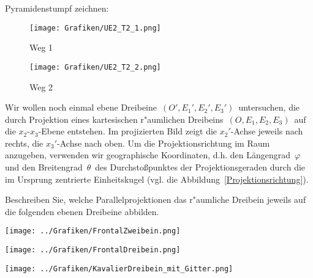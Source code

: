 \begin{Loesung}
\usetikzlibrary{calc}
	Pyramidenstumpf zeichnen:
	\begin{figure}[H]
		\centering
		\texttt{[image: Grafiken/UE2\_T2\_1.png]}
		\caption{Weg 1}
	\label{fig:T2_1}
	\end{figure}
	\begin{figure}[H]
		\centering
		\texttt{[image: Grafiken/UE2\_T2\_2.png]}
		\caption{Weg 2}
	\label{fig:T2_2}
	\end{figure}
\end{Loesung}
\begin{Aufgabe}
\footnotesize
Wir wollen noch einmal ebene Dreibeine\, $(O', E_1', E_2', E_3')$\, untersuchen, die durch Projektion eines kartesischen r"aumlichen Dreibeins\, $(O, E_1, E_2, E_3)$\, auf die $x_2$-$x_3$-Ebene entstehen. Im projizierten Bild zeigt die $x_2'$-Achse jeweils nach rechts, die $x_3'$-Achse nach oben. Um die
Projektionsrichtung im Raum anzugeben, verwenden wir \glqq geographische Koordinaten\grqq, d.h. den Längengrad \,$\varphi$\, und den Breitengrad  \,$\theta$\, des Durchstoßpunktes der Projektionsgeraden durch die im Ursprung zentrierte Einheitskugel (vgl. die Abbildung~\ref{Projektionsrichtung}).
\small

Beschreiben Sie, welche Parallelprojektionen das r"aumliche Dreibein jeweils auf die folgenden ebenen Dreibeine abbilden.\\
\begin{minipage}{0.33\textwidth}
\texttt{[image: ../Grafiken/FrontalZweibein.png]}
\end{minipage}
\hspace{0.02\textwidth}
\begin{minipage}{0.3\textwidth}
\texttt{[image: ../Grafiken/FrontalDreibein.png]}
\end{minipage}
\hspace{0.02\textwidth}
\begin{minipage}{0.3\textwidth}
\texttt{[image: ../Grafiken/KavalierDreibein\_mit\_Gitter.png]}
\end{minipage}


\end{Aufgabe}
